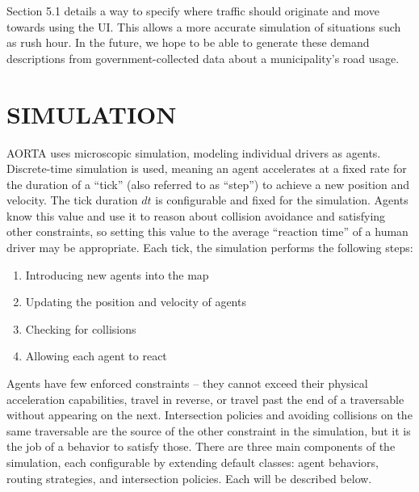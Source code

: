 \documentclass[letterpaper, 10 pt, conference]{ieeeconf}  %
\begin{document}
Section 5.1 details a way to specify where traffic should originate and move
towards using the UI. This allows a more accurate simulation of situations such
as rush hour. In the future, we hope to be able to generate these demand
descriptions from government-collected data about a municipality's road usage.


\section{SIMULATION}

AORTA uses microscopic simulation, modeling individual drivers as agents.
Discrete-time simulation is used, meaning an agent accelerates at a fixed rate
for the duration of a ``tick'' (also referred to as ``step'') to achieve a new
position and velocity. The tick duration $dt$ is configurable and fixed for the
simulation. Agents know this value and use it to reason about collision
avoidance and satisfying other constraints, so setting this value to the
average ``reaction time'' of a human driver may be appropriate. Each tick, the
simulation performs the following steps:

\begin{enumerate}
  \item Introducing new agents into the map
  \item Updating the position and velocity of agents
  \item Checking for collisions
  \item Allowing each agent to react
\end{enumerate}

Agents have few enforced constraints -- they cannot exceed their physical
acceleration capabilities, travel in reverse, or travel past the end of a
traversable without appearing on the next. Intersection policies and avoiding
collisions on the same traversable are the source of the other constraint in the
simulation, but it is the job of a behavior to satisfy those. There are three
main components of the simulation, each configurable by extending default
classes: agent behaviors, routing strategies, and intersection policies. Each
will be described below.

\end{document}
